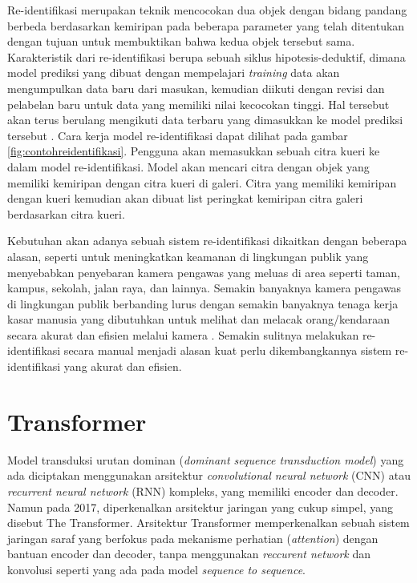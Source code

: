 Re-identifikasi merupakan teknik mencocokan dua objek dengan bidang pandang berbeda berdasarkan kemiripan pada beberapa parameter yang telah 
ditentukan dengan tujuan untuk membuktikan bahwa kedua objek tersebut sama. Karakteristik dari re-identifikasi berupa sebuah siklus hipotesis-deduktif, 
dimana model prediksi yang dibuat dengan mempelajari \emph{training} data akan mengumpulkan data baru dari masukan, kemudian diikuti dengan revisi dan 
pelabelan baru untuk data yang memiliki nilai kecocokan tinggi. Hal tersebut akan terus berulang mengikuti data terbaru yang dimasukkan ke model 
prediksi tersebut \parencite{Wechsler2014}. Cara kerja model re-identifikasi dapat dilihat pada gambar \ref{fig:contohreidentifikasi}. Pengguna akan 
memasukkan sebuah citra kueri ke dalam model re-identifikasi. Model akan mencari citra dengan objek yang memiliki kemiripan dengan citra kueri di 
galeri. Citra yang memiliki kemiripan dengan kueri kemudian akan dibuat list peringkat kemiripan citra galeri berdasarkan citra kueri.

Kebutuhan akan adanya sebuah sistem re-identifikasi dikaitkan dengan beberapa alasan, seperti untuk meningkatkan keamanan di lingkungan publik 
yang menyebabkan penyebaran kamera pengawas yang meluas di area seperti taman, kampus, sekolah, jalan raya, dan lainnya. Semakin banyaknya kamera pengawas 
di lingkungan publik berbanding lurus dengan semakin banyaknya tenaga kerja kasar manusia yang dibutuhkan untuk melihat dan melacak \linebreak orang/kendaraan 
secara akurat dan efisien melalui kamera \parencite{Zheng2016}. Semakin sulitnya melakukan re-identifikasi secara manual menjadi alasan kuat perlu dikembangkannya 
sistem re-identifikasi yang akurat dan efisien.

\section{Transformer}
\label{sec:transformer}

Model transduksi urutan dominan (\emph{dominant sequence transduction model}) yang ada diciptakan menggunakan arsitektur \emph{convolutional neural network} 
(CNN) atau \emph{recurrent neural network} (RNN) kompleks, yang memiliki encoder dan decoder. Namun pada 2017, diperkenalkan arsitektur jaringan yang cukup 
simpel, yang disebut The Transformer. Arsitektur Transformer memperkenalkan sebuah sistem jaringan saraf yang berfokus pada mekanisme perhatian (\emph{attention}) 
dengan bantuan encoder dan decoder, tanpa menggunakan \emph{reccurent network} dan konvolusi seperti yang ada pada model \emph{sequence to sequence}. \parencite{Vaswani2017}


